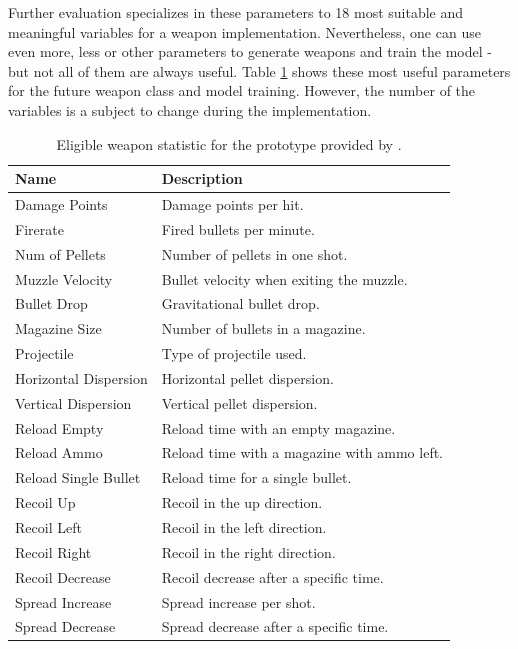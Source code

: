 \documentclass[MGS,Master,english]{twbook}%
\begin{document}
Further evaluation specializes in these parameters to 18 most suitable and meaningful variables for a weapon implementation. Nevertheless, one can use even more, less or other parameters to generate weapons and train the model - but not all of them are always useful. Table \ref{battlefield::weaponStats} shows these most useful parameters for the future weapon class and model training. However, the number of the variables is a subject to change during the implementation.
\begin{table}[!ht]
	\centering
	\begin{tabular}{|l|l|}
		\hline
		\textbf{Name}         & \textbf{Description}                         \\ \hline\hline
		Damage Points         & Damage points per hit.                       \\ \hline
		Firerate              & Fired bullets per minute.                     \\ \hline
		Num of Pellets        & Number of pellets in one shot.               \\ \hline
		Muzzle Velocity       & Bullet velocity when exiting the muzzle.     \\ \hline
		Bullet Drop           & Gravitational bullet drop.                   \\ \hline
		Magazine Size         & Number of bullets in a magazine.             \\ \hline
		Projectile            & Type of projectile used.                     \\ \hline
		Horizontal Dispersion & Horizontal pellet dispersion.                \\ \hline
		Vertical Dispersion   & Vertical pellet dispersion.                  \\ \hline
		Reload Empty          & Reload time with an empty magazine.          \\ \hline
		Reload Ammo           & Reload time with a magazine with ammo left. \\ \hline
		Reload Single Bullet  & Reload time for a single bullet.             \\ \hline
		Recoil Up             & Recoil in the up direction.                      \\ \hline
		Recoil Left           & Recoil in the left direction.                    \\ \hline
		Recoil Right          & Recoil in the right direction.                   \\ \hline
		Recoil Decrease       & Recoil decrease after a specific time.       \\ \hline
		Spread Increase       & Spread increase per shot.                    \\ \hline
		Spread Decrease       & Spread decrease after a specific time.       \\ \hline
	\end{tabular}
	\caption{Eligible weapon statistic for the prototype provided by \protect\citep{symthic::bf1stats}.}
	\label{battlefield::weaponStats}
\end{table}
\end{document}

